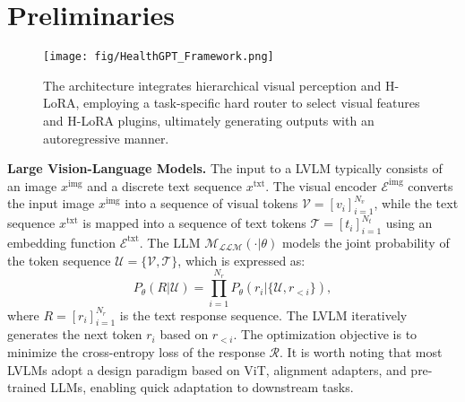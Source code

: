 \section{Preliminaries}
\label{Preliminaries}
\begin{figure*}[t]
    \centering
    \texttt{[image: fig/HealthGPT\_Framework.png]}
    \caption{The \ourmethod{} architecture integrates hierarchical visual perception and H-LoRA, employing a task-specific hard router to select visual features and H-LoRA plugins, ultimately generating outputs with an autoregressive manner.}
    \label{fig:architecture}
\end{figure*}
\noindent\textbf{Large Vision-Language Models.} 
The input to a LVLM typically consists of an image $x^{\text{img}}$ and a discrete text sequence $x^{\text{txt}}$. The visual encoder $\mathcal{E}^{\text{img}}$ converts the input image $x^{\text{img}}$ into a sequence of visual tokens $\mathcal{V} = [v_i]_{i=1}^{N_v}$, while the text sequence $x^{\text{txt}}$ is mapped into a sequence of text tokens $\mathcal{T} = [t_i]_{i=1}^{N_t}$ using an embedding function $\mathcal{E}^{\text{txt}}$. The LLM $\mathcal{M_\text{LLM}}(\cdot|\theta)$ models the joint probability of the token sequence $\mathcal{U} = \{\mathcal{V},\mathcal{T}\}$, which is expressed as:
\begin{equation}
    P_\theta(R | \mathcal{U}) = \prod_{i=1}^{N_r} P_\theta(r_i | \{\mathcal{U}, r_{<i}\}),
\end{equation}
where $R = [r_i]_{i=1}^{N_r}$ is the text response sequence. The LVLM iteratively generates the next token $r_i$ based on $r_{<i}$. The optimization objective is to minimize the cross-entropy loss of the response $\mathcal{R}$.
It is worth noting that most LVLMs adopt a design paradigm based on ViT, alignment adapters, and pre-trained LLMs\cite{liu2023llava,liu2024improved}, enabling quick adaptation to downstream tasks.


